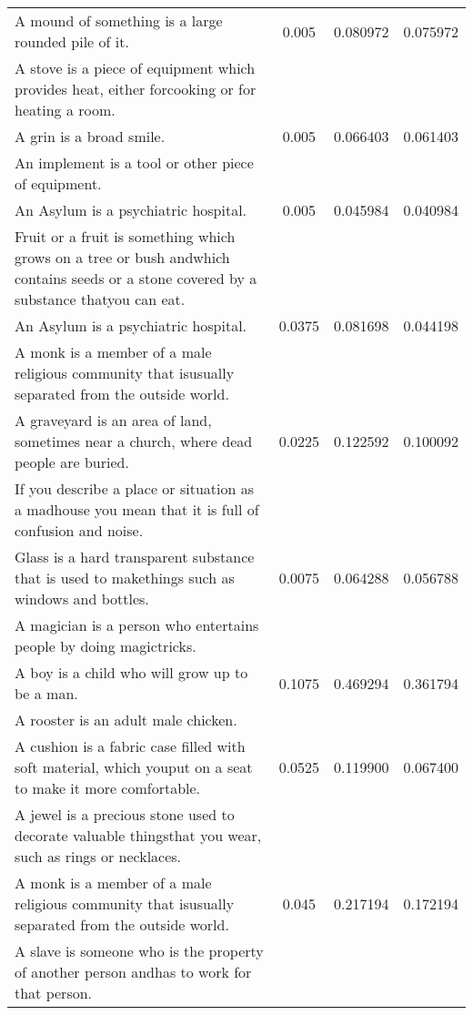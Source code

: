 \begin{center}
{\begin{longtable}{|p{9cm}|c|c|c|}
\hline
A mound of something is a large rounded pile of it. & 0.005 & 0.080972 & 0.075972 \\
A stove is a piece of equipment which provides heat, either forcooking or for heating a room. & & & \\
\hline
A grin is a broad smile. & 0.005 & 0.066403 & 0.061403 \\
An implement is a tool or other piece of equipment. & & & \\
\hline
An Asylum is a psychiatric hospital. & 0.005 & 0.045984 & 0.040984 \\
Fruit or a fruit is something which grows on a tree or bush andwhich contains seeds or a stone covered by a substance thatyou can eat. & & & \\
\hline
An Asylum is a psychiatric hospital. & 0.0375 & 0.081698 & 0.044198 \\
A monk is a member of a male religious community that isusually separated from the outside world. & & & \\
\hline
A graveyard is an area of land, sometimes near a church, where dead people are buried. & 0.0225 & 0.122592 & 0.100092 \\
If you describe a place or situation as a madhouse you mean                                                                             that it is full of confusion and noise. & & & \\
\hline
Glass is a hard transparent substance that is used to makethings such as windows and bottles. & 0.0075 & 0.064288 & 0.056788 \\
A magician is a person who entertains people by doing magictricks. & & & \\
\hline
A boy is a child who will grow up to be a man. & 0.1075 & 0.469294 & 0.361794 \\
A rooster is an adult male chicken. & & & \\
\hline
A cushion is a fabric case filled with soft material, which youput on a seat to make it more comfortable. & 0.0525 & 0.119900 & 0.067400 \\
A jewel is a precious stone used to decorate valuable thingsthat you wear, such as rings or necklaces. & & & \\
\hline
A monk is a member of a male religious community that isusually separated from the outside world. & 0.045 & 0.217194 & 0.172194 \\
A slave is someone who is the property of another person andhas to work for that person. & & & \\
\hline

\end{longtable}}
\end{center}
